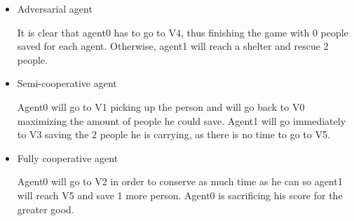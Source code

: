 \documentclass{article}                     %
\begin{document}
	\begin{itemize}
		\item Adversarial agent
		
		It is clear that agent0 has to go to V4, thus finishing the game with 0 people saved for each agent. Otherwise, agent1 will reach a shelter and rescue 2 people.
		
		\item Semi-cooperative agent
		
		Agent0 will go to V1 picking up the person and will go back to V0 maximizing the amount of people he could save. Agent1 will go immediately to V3 saving the 2 people he is carrying, as there is no time to go to V5.
		
		\item Fully cooperative agent
		
		Agent0 will go to V2 in order to conserve as much time as he can so agent1 will reach V5 and save 1 more person. Agent0 is sacrificing his score for the greater good.
		
	\end{itemize}
\end{document}
